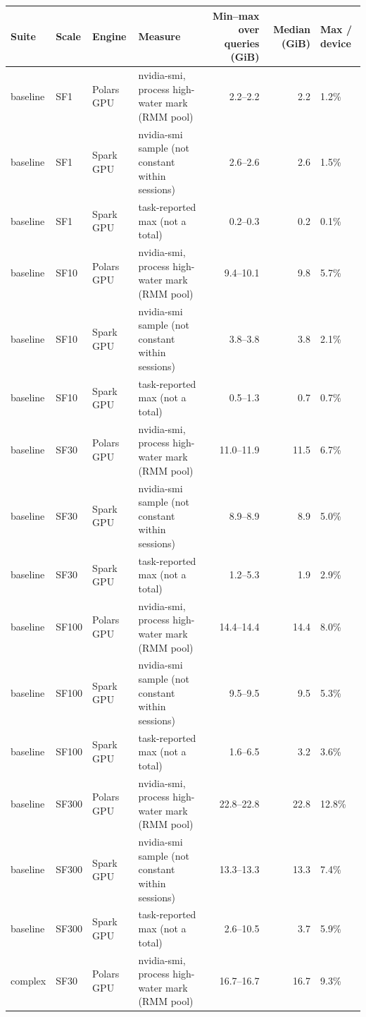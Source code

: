 \begin{tabular}{llllrrl}
\toprule
Suite & Scale & Engine & Measure & Min--max over queries (GiB) & Median (GiB) & Max / device \\
\midrule
baseline & SF1 & Polars GPU & nvidia-smi, process high-water mark (RMM pool) & 2.2--2.2 & 2.2 & 1.2\% \\
baseline & SF1 & Spark GPU & nvidia-smi sample (not constant within sessions) & 2.6--2.6 & 2.6 & 1.5\% \\
baseline & SF1 & Spark GPU & task-reported max (not a total) & 0.2--0.3 & 0.2 & 0.1\% \\
baseline & SF10 & Polars GPU & nvidia-smi, process high-water mark (RMM pool) & 9.4--10.1 & 9.8 & 5.7\% \\
baseline & SF10 & Spark GPU & nvidia-smi sample (not constant within sessions) & 3.8--3.8 & 3.8 & 2.1\% \\
baseline & SF10 & Spark GPU & task-reported max (not a total) & 0.5--1.3 & 0.7 & 0.7\% \\
baseline & SF30 & Polars GPU & nvidia-smi, process high-water mark (RMM pool) & 11.0--11.9 & 11.5 & 6.7\% \\
baseline & SF30 & Spark GPU & nvidia-smi sample (not constant within sessions) & 8.9--8.9 & 8.9 & 5.0\% \\
baseline & SF30 & Spark GPU & task-reported max (not a total) & 1.2--5.3 & 1.9 & 2.9\% \\
baseline & SF100 & Polars GPU & nvidia-smi, process high-water mark (RMM pool) & 14.4--14.4 & 14.4 & 8.0\% \\
baseline & SF100 & Spark GPU & nvidia-smi sample (not constant within sessions) & 9.5--9.5 & 9.5 & 5.3\% \\
baseline & SF100 & Spark GPU & task-reported max (not a total) & 1.6--6.5 & 3.2 & 3.6\% \\
baseline & SF300 & Polars GPU & nvidia-smi, process high-water mark (RMM pool) & 22.8--22.8 & 22.8 & 12.8\% \\
baseline & SF300 & Spark GPU & nvidia-smi sample (not constant within sessions) & 13.3--13.3 & 13.3 & 7.4\% \\
baseline & SF300 & Spark GPU & task-reported max (not a total) & 2.6--10.5 & 3.7 & 5.9\% \\
complex & SF30 & Polars GPU & nvidia-smi, process high-water mark (RMM pool) & 16.7--16.7 & 16.7 & 9.3\% \\

\end{tabular}
